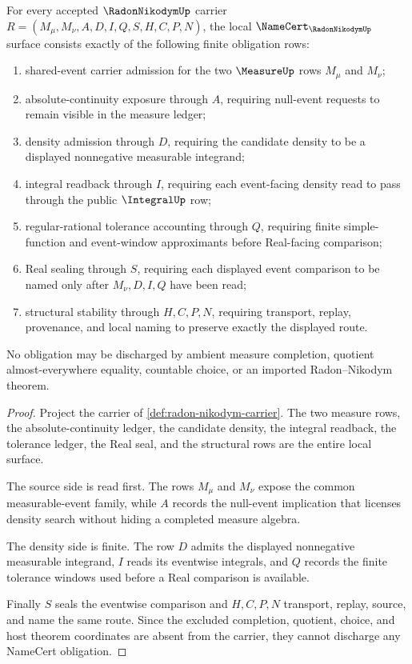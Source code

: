 \begin{theorem}
\label{thm:radon-nikodym-namecert-obligations}
For every accepted $\RadonNikodymUp$ carrier $R=(M_\mu,M_\nu,A,D,I,Q,S,H,C,P,N)$, the local $\NameCert_{\RadonNikodymUp}$ surface consists exactly of the following finite obligation rows:
\begin{enumerate}
\item shared-event carrier admission for the two $\MeasureUp$ rows $M_\mu$ and $M_\nu$;
\item absolute-continuity exposure through $A$, requiring null-event requests to remain visible in the measure ledger;
\item density admission through $D$, requiring the candidate density to be a displayed nonnegative measurable integrand;
\item integral readback through $I$, requiring each event-facing density read to pass through the public $\IntegralUp$ row;
\item regular-rational tolerance accounting through $Q$, requiring finite simple-function and event-window approximants before Real-facing comparison;
\item Real sealing through $S$, requiring each displayed event comparison to be named only after $M_\nu,D,I,Q$ have been read;
\item structural stability through $H,C,P,N$, requiring transport, replay, provenance, and local naming to preserve exactly the displayed route.
\end{enumerate}
No obligation may be discharged by ambient measure completion, quotient almost-everywhere equality, countable choice, or an imported Radon--Nikodym theorem.
\end{theorem}
\begin{proof}
Project the carrier of \autoref{def:radon-nikodym-carrier}. The two measure rows, the absolute-continuity ledger, the candidate density, the integral readback, the tolerance ledger, the Real seal, and the structural rows are the entire local surface.

The source side is read first. The rows $M_\mu$ and $M_\nu$ expose the common measurable-event family, while $A$ records the null-event implication that licenses density search without hiding a completed measure algebra.

The density side is finite. The row $D$ admits the displayed nonnegative measurable integrand, $I$ reads its eventwise integrals, and $Q$ records the finite tolerance windows used before a Real comparison is available.

Finally $S$ seals the eventwise comparison and $H,C,P,N$ transport, replay, source, and name the same route. Since the excluded completion, quotient, choice, and host theorem coordinates are absent from the carrier, they cannot discharge any NameCert obligation.
\end{proof}

